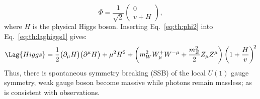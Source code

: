 \begin{equation}
  \Phi = \frac{1}{\sqrt{2}}
  \begin{pmatrix} 0 \\ v+H
  \end{pmatrix},
  \label{eq:th:phi2}
\end{equation}
where $H$ is the physical Higgs boson.
Inserting Eq.~\ref{eq:th:phi2} into Eq.~\ref{eq:th:laghiggs1} gives:
\begin{equation}
  \Lag{Higgs} =
  \frac{1}{2}\big(\partial_\mu H\big)\big(\partial^\mu H\big)
  +\mu^2H^2
  +\left(m_W^2W_\mu^+W^{-\mu} + \frac{m_Z^2}{2}Z_\mu Z^\mu\right)
  \left(1 + \frac{H}{v}\right)^{\!2}
  \label{eq:th:laghiggs2}
\end{equation}
Thus, there is spontaneous symmetry breaking (SSB) of the local $U(1)$ gauge symmetry, weak gauge
boson become massive while photons remain massless; as is consistent with observations.

